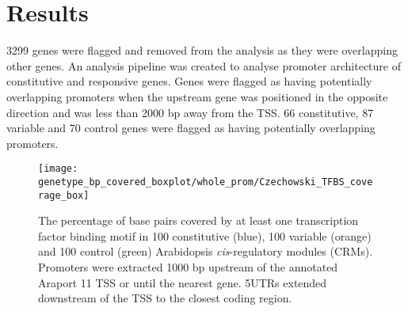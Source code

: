 \section{Results}\label{chapter1:results}

3299 genes were flagged and removed from the analysis as they were overlapping other genes.
An analysis pipeline was created to analyse promoter architecture of constitutive and responsive genes.
Genes were flagged as having potentially overlapping promoters when the upstream gene was positioned in the opposite direction and was less than 2000 bp away from the TSS.
66 constitutive, 87 variable and 70 control genes were flagged as having potentially overlapping promoters.
\begin{figure}[!h]
	\begin{center}
		\capstart
		\texttt{[image: genetype\_bp\_covered\_boxplot/whole\_prom/Czechowski\_TFBS\_coverage\_box]}
		\caption{
			The percentage of base pairs covered by at least one transcription
			factor binding motif in 100 constitutive (blue), 100 variable (orange) and 100 control (green)
			Arabidopsis \textit{cis}-regulatory modules (CRMs). Promoters were extracted 1000 bp upstream of the
			annotated Araport 11 \autocite{chengAraport11CompleteReannotation2017} TSS or until the nearest gene. 5UTRs extended downstream of the TSS to the closest coding region.
			\label{fig:bp-covered-wholeprom}
		}
	\end{center}
\end{figure}

